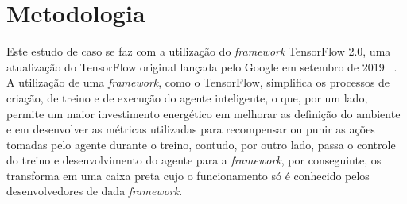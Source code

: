 

\chapter{Metodologia}
\label{cap:dqn}

Este estudo de caso se faz com a utilização do \emph{framework} TensorFlow 2.0, uma atualização do TensorFlow original lançada pelo Google em setembro de 2019 ~\citep{TensorFlow2-release}. A utilização de uma \emph{framework}, como o TensorFlow, simplifica os processos de criação, de treino e de execução do agente inteligente, o que, por um lado, permite um maior investimento energético em melhorar as definição do ambiente e em desenvolver as métricas utilizadas para recompensar ou punir as ações tomadas pelo agente durante o treino, contudo, por outro lado, passa o controle do treino e desenvolvimento do agente para a \emph{framework}, por conseguinte, os transforma em uma caixa preta cujo o funcionamento só é conhecido pelos desenvolvedores de dada \emph{framework}.

